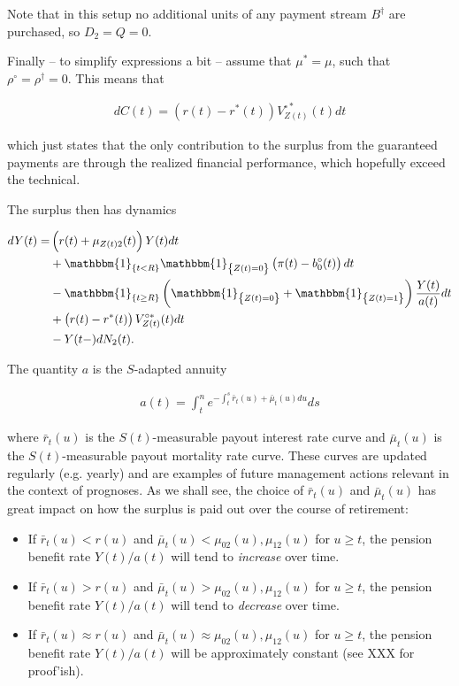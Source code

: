 \documentclass{book}
\newcommand{\1}[1]{\mathbbm{1}_{\left\lbrace #1 \right\rbrace}}
\theoremstyle{break}
\theoremstyle{remark}
\numberwithin{equation}{section}
\begin{document}
Note that in this setup no additional units of any payment stream $B^\dagger$ are purchased, so $D_2=Q=0$.

Finally -- to simplify expressions a bit -- assume that $\mu^*=\mu$, such that $\rho^\circ = \rho^\dagger = 0$. This means that

\begin{align*}
	dC(t) = \left( r(t) - r^*(t) \right) V_{Z(t)}^{\circ*}(t) dt
\end{align*}

which just states that the only contribution to the surplus from the guaranteed payments are through the realized financial performance, which hopefully exceed the technical.

The surplus then has dynamics

\begin{align} \label{YExampleDyn}
\begin{split}
		dY(t) =& \left( r(t) + \mu_{Z(t)2}(t) \right) Y(t) dt \\
	&+ \1{t<R} \1{Z(t)=0} \left(\pi(t) - b_0^\circ(t) \right) dt \\
	&- \1{t \geq R} \left( \1{Z(t)=0} + \1{Z(t)=1} \right) \frac{Y(t)}{a(t)} dt \\
	&+ \left( r(t) - r^*(t) \right) V_{Z(t)}^{\circ*}(t) dt \\
	&- Y(t-) dN_2(t).
\end{split}
\end{align}

The quantity $a$ is the $S$-adapted annuity

\begin{align*}
	a(t) = \int_t^n e^{-\int_t^s \bar{r}_t(u) + \bar{\mu}_t(u) du} ds
\end{align*}

where $\bar{r}_t(u)$ is the $S(t)$-measurable payout interest rate curve and $\bar{\mu}_t(u)$ is the  $S(t)$-measurable payout mortality rate curve. These curves are updated regularly (e.g. yearly) and are examples of future management actions relevant in the context of prognoses. As we shall see, the choice of $\bar{r}_t(u)$ and $\bar{\mu}_t(u)$ has great impact on how the surplus is paid out over the course of retirement:

\begin{itemize}
	\item If $\bar{r}_t(u)<r(u)$ and $\bar{\mu}_t(u)<\mu_{02}(u),\mu_{12}(u)$ for $u \geq t$, the pension benefit rate $Y(t)/a(t)$ will tend to \textit{increase} over time.
	\item If $\bar{r}_t(u)>r(u)$ and $\bar{\mu}_t(u)>\mu_{02}(u),\mu_{12}(u)$ for $u \geq t$, the pension benefit rate $Y(t)/a(t)$ will tend to \textit{decrease} over time.
	\item If $\bar{r}_t(u)\approx r(u)$ and $\bar{\mu}_t(u)\approx \mu_{02}(u),\mu_{12}(u)$ for $u \geq t$, the pension benefit rate $Y(t)/a(t)$ will be approximately constant (see XXX for proof'ish).
\end{itemize}
\end{document}
